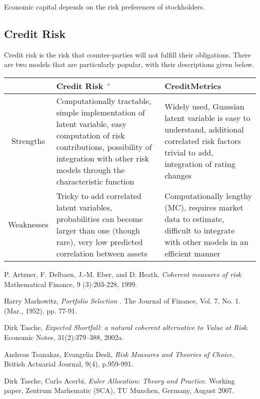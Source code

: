 \documentclass[12pt]{article}
\theoremstyle{definition}
\begin{document}
Economic capital depends on the risk preferences of stockholders.  

\subsection{Credit Risk}

Credit risk is the risk that counter-parties will not fulfill their obligations.  There are two models that are particularly popular, with their descriptions given below.

\begin{tabular}{c| p{5cm}| p{5cm} }
  & Credit Risk \(^+\) & CreditMetrics \\
\hline
Strengths & Computationally tractable, simple implementation of latent variable, easy computation of risk contributions, possibility of integration with other risk models through the characteristic function & Widely used, Guassian latent variable is easy to understand, additional correlated risk factors trivial to add, integration of rating changes \\
\hline
Weaknesses & Tricky to add correlated latent variables, probabilities can become larger than one (though rare), very low predicted correlation between assets & Computationally lengthy (MC), requires market data to estimate, difficult to integrate with other models in an efficient manner \\

\end{tabular}

  


\begin{thebibliography}{9}

P. Artzner, F. Delbaen, J.-M. Eber, and D. Heath.  \emph{Coherent measures of risk} Mathematical Finance, 9 (3):203-228, 1999.

Harry Markowitz, \emph{Portfolio Selection
}.
The Journal of Finance, Vol. 7, No. 1. (Mar., 1952), pp. 77-91.


Dirk Tasche, 
\emph{Expected Shortfall: a natural coherent alternative
to Value at Risk}.
Economic Notes, 31(2):379–388, 2002a.

Andreas Tsanakas, Evangelia Desli, \emph{Risk Measures and Theories of Choice}. British Actuarial Journal, 9(4), p.959-991.

  Dirk Tasche, Carlo Acerbi,
  \emph{Euler Allocation: Theory and Practice}.
  Working paper, Zentrum Marhematic (SCA),
TU Munchen, Germany, August 2007.

\end{thebibliography}
\end{document}

